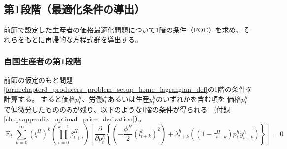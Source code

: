
\subsection{第1段階（最適化条件の導出）}
\label{sec:chapter3_producers_stage1}
前節で設定した生産者の価格最適化問題について1階の条件（FOC）を求め、それらをもとに再帰的な方程式群を導出する。

\subsubsection{自国生産者の第1段階}
\label{sec:chapter3_producers_stage1_home}
前節の仮定のもと問題\ref{form:chapter3_producers_problem_setup_home_lagrangian_def}の1階の条件を計算する。
すると価格\(p_t^h\)、労働\(l_t^h\)あるいは生産\(y_t^h\)のいずれかを含む項を
価格\(p_t^h\)で偏微分したもののみが残り、以下のような1階の条件が得られる
（付録\ref{chap:appendix_optimal_price_derivation}）。
\begin{equation}
\label{form:chapter3_producers_stage1_home_expectation_eq}
    \operatorname{E}_t\sum_{k=0}^{\infty}(\xi^H)^k\left(\prod_{i=0}^{k-1}\beta_{t+i}^H\right)\left[\frac{\partial}{\partial p_t^h}\left\{\left(-\frac{\phi^H}{2}(l_{t+k}^h)^2\right)+\lambda_{t+k}^h\left((1-\tau_{t+k}^H)p_t^hy_{t+k}^h\right)\right\}\right]=0
\end{equation}

